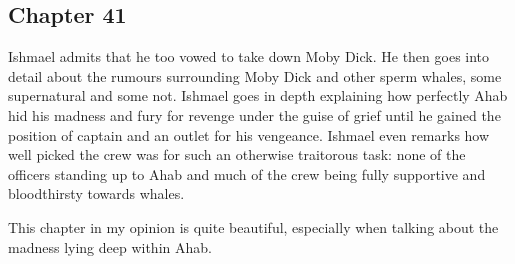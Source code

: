 \subsection{Chapter 41}

Ishmael admits that he too vowed to take down Moby Dick. He then goes into
detail about the rumours surrounding Moby Dick and other sperm whales, some
supernatural and some not. Ishmael goes in depth explaining how perfectly Ahab
hid his madness and fury for revenge under the guise of grief until he gained
the position of captain and an outlet for his vengeance. Ishmael even remarks
how well picked the crew was for such an otherwise traitorous task: none of the
officers standing up to Ahab and much of the crew being fully supportive and
bloodthirsty towards whales.

This chapter in my opinion is quite beautiful, especially when talking about
the madness lying deep within Ahab.
